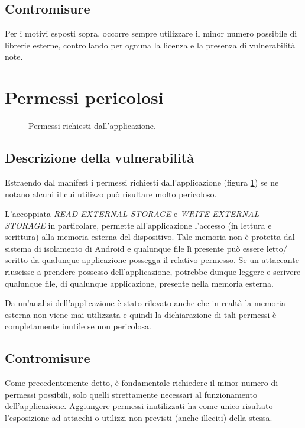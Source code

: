 \subsection{Contromisure}
Per i motivi esposti sopra, occorre sempre utilizzare il minor numero possibile di librerie esterne, controllando per ognuna la licenza e la presenza di vulnerabilità note.

\section{Permessi pericolosi}

\begin{figure}[h]
	\centering 
	\caption{Permessi richiesti dall'applicazione.}
	\label{fig:permessi}
\end{figure}

\subsection{Descrizione della vulnerabilità}

Estraendo dal manifest i permessi richiesti dall'applicazione (figura \ref{fig:permessi}) se ne notano alcuni il cui utilizzo può risultare molto pericoloso. 

L'accoppiata \emph{READ EXTERNAL STORAGE} e \emph{WRITE EXTERNAL STORAGE} in particolare, permette all'applicazione l'accesso (in lettura e scrittura) alla memoria esterna del dispositivo. Tale memoria non è protetta dal sistema di isolamento di Android e qualunque file lì presente può essere letto$/$scritto da qualunque applicazione possegga il relativo permesso. Se un attaccante riuscisse a prendere possesso dell'applicazione, potrebbe dunque leggere e scrivere qualunque file, di qualunque applicazione, presente nella memoria esterna.

Da un'analisi dell'applicazione è stato rilevato anche che in realtà la memoria esterna non viene mai utilizzata e quindi la dichiarazione di tali permessi è completamente inutile se non pericolosa.

\subsection{Contromisure}
Come precedentemente detto, è fondamentale richiedere il minor numero di permessi possibili, solo quelli strettamente necessari al funzionamento dell'applicazione. Aggiungere permessi inutilizzati ha come unico risultato l'esposizione ad attacchi o utilizzi non previsti (anche illeciti) della stessa.

